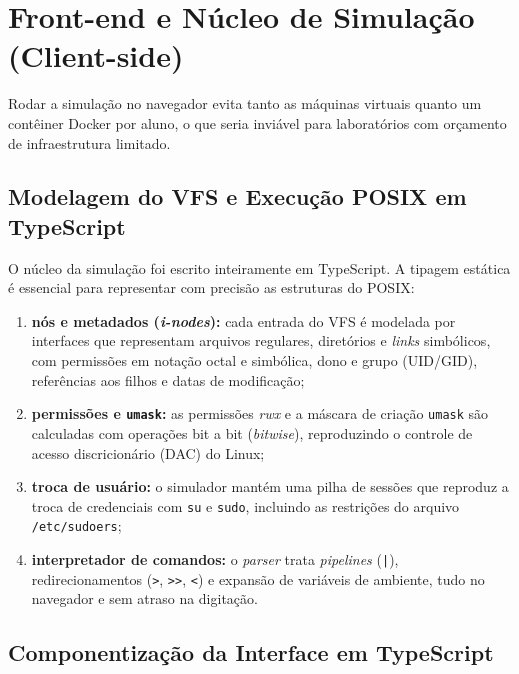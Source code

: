 \section{Front-end e Núcleo de Simulação (Client-side)}
\label{sec:frontend-simulacao}

Rodar a simulação no navegador evita tanto as máquinas virtuais quanto um contêiner Docker por aluno, o que seria inviável para laboratórios com orçamento de infraestrutura limitado.

\subsection{Modelagem do VFS e Execução POSIX em TypeScript}
\label{sec:vfs-typescript}

O núcleo da simulação foi escrito inteiramente em TypeScript. A tipagem estática é essencial para representar com precisão as estruturas do POSIX:

\begin{enumerate}
    \item \textbf{nós e metadados (\textit{i-nodes}):} cada entrada do VFS é modelada por interfaces que representam arquivos regulares, diretórios e \textit{links} simbólicos, com permissões em notação octal e simbólica, dono e grupo (UID/GID), referências aos filhos e datas de modificação;
    \item \textbf{permissões e \texttt{umask}:} as permissões \textit{rwx} e a máscara de criação \texttt{umask} são calculadas com operações bit a bit (\textit{bitwise}), reproduzindo o controle de acesso discricionário (DAC) do Linux;
    \item \textbf{troca de usuário:} o simulador mantém uma pilha de sessões que reproduz a troca de credenciais com \texttt{su} e \texttt{sudo}, incluindo as restrições do arquivo \texttt{/etc/sudoers};
    \item \textbf{interpretador de comandos:} o \textit{parser} trata \textit{pipelines} (\texttt{|}), redirecionamentos (\texttt{>}, \texttt{>>}, \texttt{<}) e expansão de variáveis de ambiente, tudo no navegador e sem atraso na digitação.
\end{enumerate}

\subsection{Componentização da Interface em TypeScript}
\label{sec:interface-ts}

